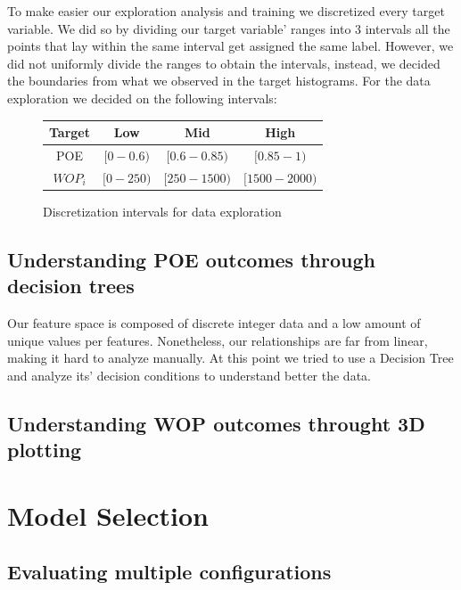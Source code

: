 \documentclass[12pt,letterpaper]{article}
\begin{document}
To make easier our exploration analysis and training we discretized every target variable.
We did so by dividing our target variable' ranges into 3 intervals all the points that
lay within the same interval get assigned the same label. However, we did not uniformly 
divide the ranges to obtain the intervals, instead, we decided the boundaries from what
we observed in the target histograms.
For the data exploration we decided on the following intervals:
\begin{figure}[h]
    \begin{center}
    \begin{tabular}{c c c c}
            \hline
            Target & Low & Mid & High \\
            \hline\hline
            POE & $[0-0.6)$ & $[0.6-0.85)$ & $[0.85-1)$ \\
            $WOP_i$ & $[0-250)$ & $[250-1500)$ & $[1500-2000)$ \\
            \hline
        \end{tabular}
    \end{center}
    \caption{Discretization intervals for data exploration}
    \label{table:de_discreteintervals}
\end{figure}
\subsection{Understanding POE outcomes through decision trees}
Our feature space is composed of discrete integer data and a low
amount of unique values per features. Nonetheless, our relationships
are far from linear, making it hard to analyze manually. At this point
we tried to use a Decision Tree and analyze its' decision conditions to
understand better the data.


\subsection{Understanding WOP outcomes throught 3D plotting}








\section{Model Selection}
\subsection{Evaluating multiple configurations}
\end{document}
